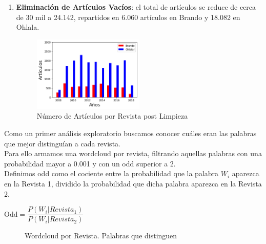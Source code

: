 \documentclass[a4paper]{article}
\begin{document}
\begin{enumerate}
\item \textbf{Eliminaci\'on de Art\'iculos Vac\'ios}: el total de art\'iculos se reduce de cerca de 30 mil a 24.142, repartidos en 6.060 art\'iculos en Brando y 18.082 en Ohlala.
\begin{figure}[H]
\centering
\includegraphics[width=0.5\textwidth]{graficos/corpus_20k.png}
\caption{N\'umero de Art\'iculos por Revista post Limpieza} 
\end{figure}
\end{enumerate}

Como un primer an\'alisis exploratorio buscamos conocer cu\'ales eran las palabras que mejor distingu\'ian a cada revista.\\
Para ello armamos una wordcloud por revista, filtrando aquellas palabras con una probabilidad mayor a 0.001 y con un odd superior a 2.\\
\linebreak
Definimos odd como el cociente entre la probabilidad que la palabra $W_{i}$ aparezca en la Revista 1, dividido la probabilidad que dicha palabra aparezca en la Revista 2.\\

\begin{center}
$\text{Odd} = \dfrac{P (W_i | Revista_1)}{P (W_i | Revista_2)}$
\end{center}


\begin{figure}[H]
\centering
{}
\caption{Wordcloud por Revista. Palabras que distinguen} \label{fig:wordcloud}
\end{figure}
\end{document}
